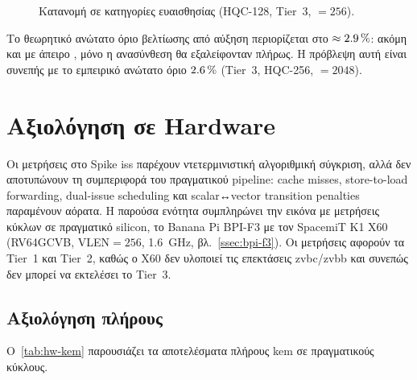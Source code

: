 \begin{figure}[htbp]
  \centering
  
  \captionsetup{list=no}
  \caption[Κατανομή \instret σε κατηγορίες ευαισθησίας στο \VLEN]{Κατανομή \instret σε κατηγορίες ευαισθησίας \VLEN (HQC-128, Tier~3, \VLEN$= \num{256}$).}
  \label{fig:vlen-budget}
\end{figure}

Το θεωρητικό ανώτατο όριο βελτίωσης από αύξηση \VLEN περιορίζεται στο
$\approx\SI{2.9}{\percent}$: ακόμη και με άπειρο \VLEN, μόνο η ανασύνθεση
θα εξαλείφονταν πλήρως. Η πρόβλεψη αυτή είναι συνεπής με το εμπειρικό
ανώτατο όριο $\SI{2.6}{\percent}$ (Tier~3, HQC-256, \VLEN$= \num{2048}$).

\section{Αξιολόγηση σε Hardware}
\label{sec:hw-evaluation}

Οι μετρήσεις \instret στο Spike \gls{iss} παρέχουν ντετερμινιστική αλγοριθμική
σύγκριση, αλλά δεν αποτυπώνουν τη συμπεριφορά του πραγματικού pipeline: cache misses,
store-to-load forwarding, dual-issue scheduling και scalar↔vector transition
penalties παραμένουν αόρατα. Η παρούσα ενότητα
συμπληρώνει την εικόνα με μετρήσεις κύκλων σε πραγματικό silicon, το Banana Pi
BPI-F3 με τον SpacemiT K1 X60 (RV64GCVB, VLEN$= \num{256}$, \SI{1.6}{\giga\hertz},
βλ.\ \cref{ssec:bpi-f3}). Οι μετρήσεις αφορούν τα Tier~1
και Tier~2, καθώς ο X60 δεν υλοποιεί τις επεκτάσεις
\gls{zvbc}/\gls{zvbb} και συνεπώς δεν μπορεί να εκτελέσει το Tier~3.

\subsection{Αξιολόγηση πλήρους \KEM}
\label{ssec:hw-kem}

Ο~\cref{tab:hw-kem} παρουσιάζει τα αποτελέσματα πλήρους \gls{kem} σε
πραγματικούς κύκλους.

